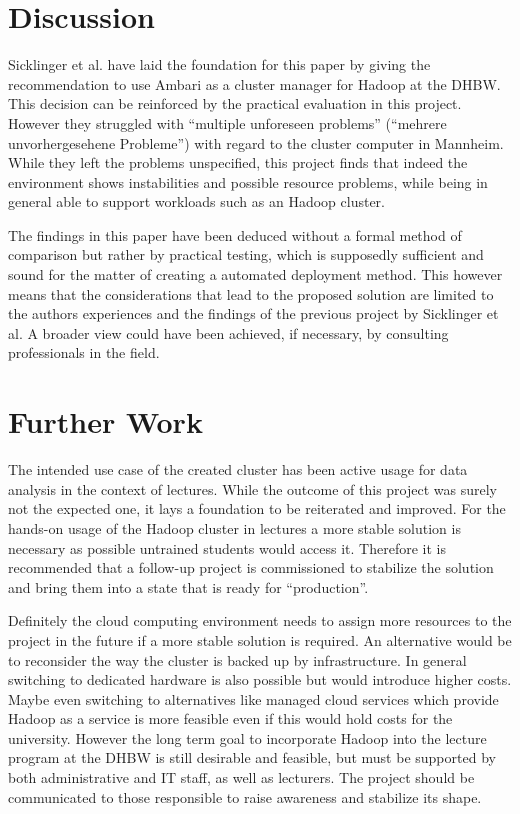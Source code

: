 \section{Discussion}

Sicklinger et al. have laid the foundation for this paper by giving the 
recommendation to use Ambari as a cluster manager for Hadoop at the \ac{DHBW}.
This decision can be reinforced by the practical evaluation in this project.
However they struggled with \enquote{multiple unforeseen problems} (\enquote{mehrere unvorhergesehene
Probleme}) \autocite[][p. 53]{wi2018managementsystems} with regard to the cluster computer in Mannheim.
While they left the problems unspecified, this project finds that indeed the environment shows instabilities and possible resource problems, while being in general able to support workloads such as an Hadoop cluster.

The findings in this paper have been deduced without a formal method of comparison but rather by practical testing, which is supposedly sufficient and sound for the matter of creating a automated deployment method.
This however means that the considerations that lead to the proposed solution are limited 
to the authors experiences and the findings of the previous project by Sicklinger et al.
A broader view could have been achieved, if necessary, by consulting professionals in the field.

\section{Further Work}

The intended use case of the created cluster has been active usage for data analysis in the context of lectures.
While the outcome of this project was surely not the expected one, 
it lays a foundation to be reiterated and improved.
For the hands-on usage of the Hadoop cluster in lectures a more stable 
solution is necessary as possible untrained students would access it.
Therefore it is recommended that a follow-up project is commissioned to stabilize the solution and bring them into a state that is ready for \enquote{production}.

Definitely the cloud computing environment needs to assign more resources to the project in the future if a more stable solution is required.
An alternative would be to reconsider the way the cluster is backed up by infrastructure.
In general switching to dedicated hardware is also possible but would introduce higher costs.
Maybe even switching to alternatives like managed cloud services which provide Hadoop as a service is more feasible even if this would hold costs for the university.
However the long term goal to incorporate Hadoop into the lecture program at the \ac{DHBW} is still desirable and feasible, but must be supported by both administrative and \ac{IT} staff, as well as lecturers. 
The project should be communicated to those responsible to raise awareness and stabilize its shape.



